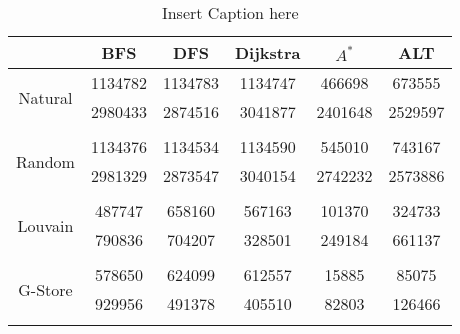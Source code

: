 \begin{table}
	\begin{center}
		 \begin{tabular}[c]{c c c c c c} \toprule
			  & BFS & DFS & Dijkstra & $A^*$  & ALT \\ \midrule 
 			\multirow{2}{*}{Natural}  & 1134782 & 1134783 & 1134747 & 466698 & 673555 \\ 
 				 & 2980433 & 2874516 & 3041877 & 2401648 & 2529597 \\ 
 				&&&&& \\[-0.5em]
 			\multirow{2}{*}{Random}  & 1134376 & 1134534 & 1134590 & 545010 & 743167 \\ 
 				 & 2981329 & 2873547 & 3040154 & 2742232 & 2573886 \\ 
 				&&&&& \\[-0.5em]
 			\multirow{2}{*}{Louvain}  & 487747 & 658160 & 567163 & 101370 & 324733 \\ 
 				 & 790836 & 704207 & 328501 & 249184 & 661137 \\ 
 				&&&&& \\[-0.5em]
 			\multirow{2}{*}{G-Store}  & 578650 & 624099 & 612557 & 15885 & 85075 \\ 
 				 & 929956 & 491378 & 405510 & 82803 & 126466 \\ 
 				&&&&& \\[-0.5em]
 					\end{tabular}  
  	 \end{center}
	 \caption{ Insert Caption here}
\end{table}